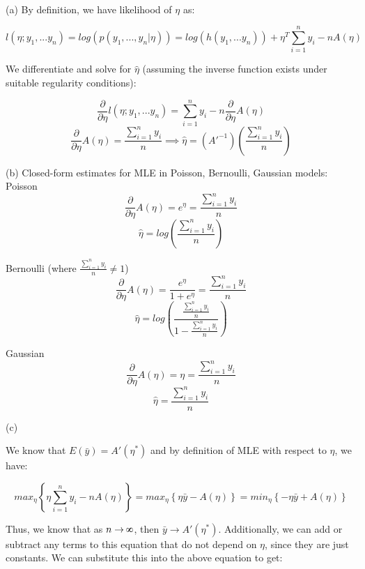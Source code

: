 \documentclass[11pt]{article}
\def\infinity{\rotatebox{90}{8}}
\newenvironment{problem}[2][Problem]{\begin{trivlist}
\item[\hskip \labelsep {\bfseries #1}\hskip \labelsep {\bfseries #2.}]}{\end{trivlist}}
\begin{document}
\begin{problem}{2.3}
\text{ }\\

(a) By definition, we have likelihood of $\eta$ as:

\[l(\eta; y_1,...y_n) = log(p(y_1,...,y_n|\eta)) = log(h(y_1,...y_n)) + \eta^T\sum^{n}_{i=1}y_i-nA(\eta)\]

\begin{adjustwidth}{2.5em}{0pt}
We differentiate and solve for $\hat{\eta}$ (assuming the inverse function exists under suitable regularity conditions):
\end{adjustwidth}

\[\frac{\partial}{\partial\eta}l(\eta; y_1,...y_n) = \sum^{n}_{i=1}y_i-n\frac{\partial}{\partial\eta}A(\eta)\]
\[\frac{\partial}{\partial\eta}A(\eta) = \frac{\sum^{n}_{i=1}y_i}{n} \implies \hat{\eta} = (A'^{-1})(\frac{\sum^{n}_{i=1}y_i}{n})\]

(b) Closed-form estimates for MLE in Poisson, Bernoulli, Gaussian models:
\\

Poisson
\[\frac{\partial}{\partial\eta}A(\eta) = e^{\eta} = \frac{\sum^{n}_{i=1}y_i}{n}\]
\[\hat{\eta} = log(\frac{\sum^{n}_{i=1}y_i}{n}) \]

Bernoulli (where $\frac{\sum^{n}_{i=1}y_i}{n} \neq 1$)
\[\frac{\partial}{\partial\eta}A(\eta) = \frac{e^{\eta}}{1+e^{\eta}} = \frac{\sum^{n}_{i=1}y_i}{n}\]
\[\hat{\eta} = log(\frac{\frac{\sum^{n}_{i=1}y_i}{n}}{1-\frac{\sum^{n}_{i=1}y_i}{n}})\]

Gaussian
\[\frac{\partial}{\partial\eta}A(\eta) = \eta = \frac{\sum^{n}_{i=1}y_i}{n} \]
\[\hat{\eta} = \frac{\sum^{n}_{i=1}y_i}{n}\]

(c)
\begin{adjustwidth}{2.5em}{0pt}
We know that $E(\bar{y}) = A'(\eta^{*})$ and by definition of MLE with respect to $\eta$, we have:
\end{adjustwidth}

\[max_{\eta}\left\{{\eta\sum^{n}_{i=1}{y_i}-nA(\eta)}\right\} = max_{\eta}\left\{{\eta\bar{y}-A(\eta)}\right\} = min_{\eta}\left\{{-\eta\bar{y}+A(\eta)}\right\}\]

\begin{adjustwidth}{2.5em}{0pt}
Thus, we know that as $n \rightarrow \infinity$, then $\bar{y} \rightarrow A'(\eta^{*})$. Additionally, we can add or subtract any terms to this equation that do not depend on $\eta$, since they are just constants. We can substitute this into the above equation to get:
\end{adjustwidth}


\end{problem}
\end{document}
